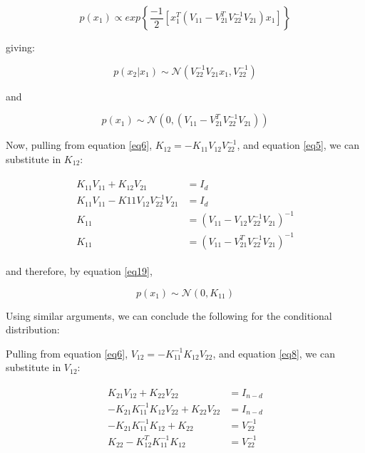 \begin{equation}\label{eq17}
p(x_1) \propto exp \left\{ \frac{-1}{2}\left[x_1^T(V_{11}- V_{21}^TV_{22}^{-1}V_{21})x_1\right]\right\}
\end{equation}

giving:

\begin{equation}\label{eq18}
p(x_2|x_1) \sim \mathcal{N}(V_{22}^{-1}V_{21}x_1,V_{22}^{-1})
\end{equation}

and

\begin{equation}\label{eq19}
p(x_1) \sim \mathcal{N}\left(0, (V_{11}- V_{21}^TV_{22}^{-1}V_{21})\right)
\end{equation}

Now, pulling from equation \ref{eq6}, $K_{12}=-K_{11}V_{12}V_{22}^{-1}$, and equation \ref{eq5}, we can substitute in $K_{12}$:

\begin{align}
\label{eq20}
\begin{split}
{K}_{11}{V}_{11} + {K}_{12}{V}_{21} & = I_d \\
{K}_{11}{V}_{11} - K{11}V_{12}V_{22}^{-1}{V}_{21} & = I_d  \\
{K}_{11} & = \left({V}_{11} - V_{12}V_{22}^{-1}{V}_{21}\right)^{-1} \\
{K}_{11} & = \left({V}_{11} - V_{21}^TV_{22}^{-1}{V}_{21}\right)^{-1}
\end{split}
\end{align}

and therefore, by equation \ref{eq19},

\begin{equation}\label{eq21}
p(x_1) \sim \mathcal{N}\left(0, K_{11}\right)
\end{equation}

Using similar arguments, we can conclude the following for the conditional distribution:

Pulling from equation \ref{eq6}, $V_{12}=-K_{11}^{-1}K_{12}V_{22}$, and equation \ref{eq8}, we can substitute in $V_{12}$:

\begin{align}
\label{eq22}
\begin{split}
{K}_{21}{V}_{12} + {K}_{22}{V}_{22} & = I_{n-d} \\
-{K}_{21}K_{11}^{-1}K_{12}V_{22} + {K}_{22}{V}_{22} & = I_{n-d} \\
-{K}_{21}K_{11}^{-1}K_{12} + {K}_{22} & = {V}_{22}^{-1} \\
{K}_{22} -{K}_{12}^TK_{11}^{-1}K_{12} & = {V}_{22}^{-1}
\end{split}
\end{align}

